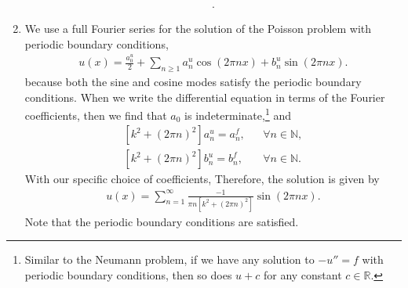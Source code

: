 \documentclass[11pt]{article}
\begin{document}
\begin{solution}
\begin{enumerate}
\begin{align*}
            .
        \end{align*}

        \item 
        We use a full Fourier series for the solution of the Poisson problem with periodic boundary conditions,
        \begin{align*}
            u(x) = \frac{a^{u}_0}{2} + \sum_{n \geq 1} a^{u}_{n} \cos( 2 \pi n x ) + b^{u}_{n} \sin( 2 \pi n x ).
        \end{align*}
        because both the sine and cosine modes satisfy the periodic boundary conditions. 
        When we write the differential equation in terms of the Fourier coefficients, then we find that $a_0$ is indeterminate,\footnote{Similar 
        to the Neumann problem, if we have any solution to $-u'' = f$ with periodic boundary conditions, then so does $u+c$ for any constant $c \in \mathbb R$.} 
        and 
        \begin{align*}
            \left [k^2 + (2 \pi n)^2 \right] a^{u}_{n} = a^{f}_{n}, & & \forall n \in \mathbb{N}
            ,
            \\ 
            \left [k^2 + (2 \pi n)^2 \right] b^{u}_{n} = b^{f}_{n}, & & \forall n \in \mathbb{N}
            .
        \end{align*}
        With our specific choice of coefficients, 
        Therefore, the solution is given by
        \begin{align*}
            u(x) = \sum_{n=1}^{\infty} \frac{-1}{\pi n \left[k^2 + (2 \pi n)^2 \right]} \sin(2 \pi n x).
        \end{align*}
        Note that the periodic boundary conditions are satisfied.
    \end{enumerate}
\end{solution}
\end{document}
